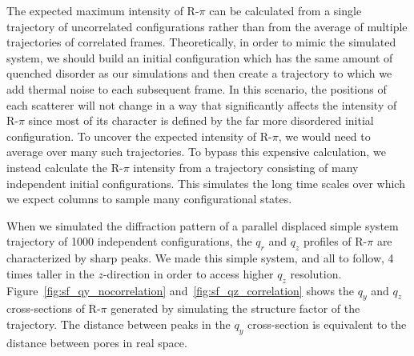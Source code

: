 \documentclass[journal=jpcbfk,manuscript=article]{achemso}
\begin{document}
  The expected maximum intensity of R-$\pi$ can be calculated from a single
  trajectory of uncorrelated configurations rather than from the average of 
  multiple trajectories of correlated frames. Theoretically, in order to
  mimic the simulated system, we should build an initial configuration which 
  has the same amount of quenched disorder as our simulations and then create
  a trajectory to which we add thermal noise to each subsequent frame. In this
  scenario, the positions of each scatterer will not change in a way that 
  significantly affects the intensity of R-$\pi$ since most of its character 
  is defined by the far more disordered initial configuration. To uncover the
  expected intensity of R-$\pi$, we would need to average over many such 
  trajectories. To bypass this expensive calculation, we instead calculate the
  R-$\pi$ intensity from a trajectory consisting of many independent initial 
  configurations. This simulates the long time scales over which we expect 
  columns to sample many configurational states. %
  
  When we simulated the diffraction pattern of a parallel displaced simple
  system trajectory of 1000 independent configurations, the
  $q_r$ and $q_z$ profiles of R-$\pi$ are characterized by sharp peaks. We made
  this simple system, and all to follow, 4 times taller in the $z$-direction in
  order to access higher $q_z$ resolution. Figure~\ref{fig:sf_qy_nocorrelation}
  and~\ref{fig:sf_qz_correlation} shows the $q_y$ and $q_z$ cross-sections of
  R-$\pi$ generated by simulating the structure factor of the trajectory. The
  distance between peaks in the $q_y$ cross-section is equivalent to the distance
  between pores in real space.
\end{document}
